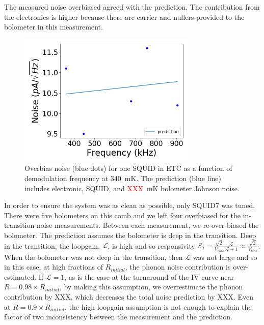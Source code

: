 The measured noise overbiased agreed with the prediction. 
The contribution from the electronics is higher because there are carrier and nullers provided to the bolometer in this measurement. 



\begin{figure}[ht!]
\begin{center}
\includegraphics[height=2.5in]{figures/overbias_noise.png}
\caption{Overbias noise (blue dots) for one \ac{SQUID} in \ac{ETC} as a function of demodulation frequency at 340~mK. The prediction (blue line) includes electronic, \ac{SQUID}, and \textcolor{red}{XXX}~mK bolometer Johnson noise. 
\label{fig:overbias_noise} }
\end{center}
\end{figure}



In order to ensure the system was as clean as possible, only \ac{SQUID}7 was tuned. 
There were five bolometers on this comb and we left four overbiased for the in-transition noise measurements. 
Between each measurement, we re-over-biased the bolometer. 
The prediction assumes the bolometer is deep in the transition. 
Deep in the transition, the loopgain, $\mathscr{L}$, is high and so responsivity $S_{I} = \frac{\sqrt{2}}{V_{bias}} \frac{\mathscr{L}}{\mathscr{L}+1} \approx \frac{\sqrt{2}}{V_{bias}} $. 
When the bolometer was not deep in the transition, then $\mathscr{L}$ was not large and so in this case, at high fractions of $R_{initial}$, the phonon noise contribution is over-estimated. 
If $\mathscr{L} = 1$, as is the case at the turnaround of the IV curve near $R = 0.98 \times R_{initial}$, by making this assumption, we overrestimate the phonon contribution by XXX, which decreases the total noise prediction by XXX. 
Even at $R = 0.9 \times R_{initial}$, the high loopgain assumption is not enough to explain the factor of two inconsistency between the measurement and the prediction. 
 

